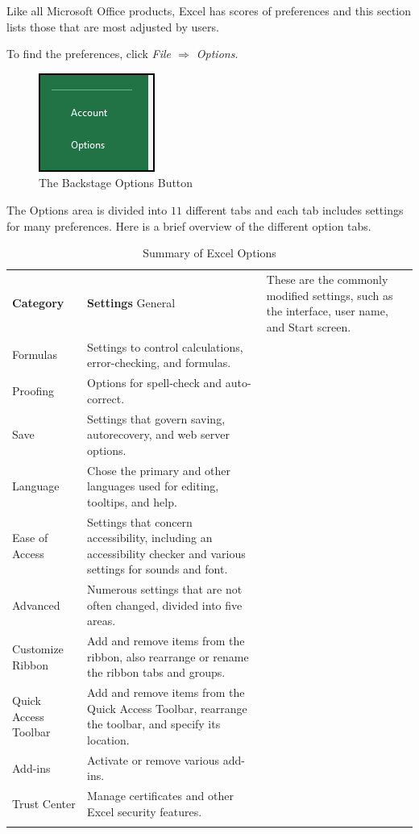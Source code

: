 Like all Microsoft Office products, Excel has scores of preferences and this section lists those that are most adjusted by users.

To find the preferences, click \textit{File $ \Rightarrow $ Options}.

\begin{figure}[H]
	\centering
	\includegraphics[width=\maxwidth{.35\linewidth}]{gfx/ch09_fig50}
	\caption{The Backstage Options Button}
	\label{09:fig68}
\end{figure}
 
The Options area is divided into $ 11 $ different tabs and each tab includes settings for many preferences. Here is a brief overview of the different option tabs.

\begin{table}[H]
	{\small
		\begin{longtable}{L{1.00in}L{3.00in}} %
			\textbf{Category} & \textbf{Settings} \endhead
			\hline
			General & These are the commonly modified settings, such as the interface, user name, and Start screen.\\
			Formulas & Settings to control calculations, error-checking, and formulas.\\
			Proofing & Options for spell-check and auto-correct.\\
			Save & Settings that govern saving, autorecovery, and web server options.\\
			Language & Chose the primary and other languages used for editing, tooltips, and help.\\
			Ease of Access & Settings that concern accessibility, including an accessibility checker and various settings for sounds and font.\\
			Advanced & Numerous settings that are not often changed, divided into five areas.\\
			Customize Ribbon & Add and remove items from the ribbon, also rearrange or rename the ribbon tabs and groups.\\
			Quick Access Toolbar & Add and remove items from the Quick Access Toolbar, rearrange the toolbar, and specify its location.\\
			Add-ins & Activate or remove various add-ins.\\
			Trust Center & Manage certificates and other Excel security features.\\
			\caption{Summary of Excel Options}
			\label{09:tab03}
		\end{longtable}
	} %
\end{table}

